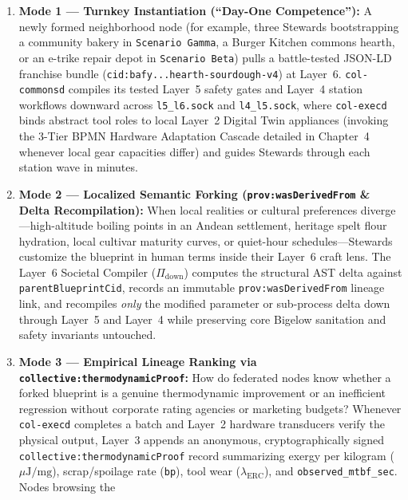 \begin{enumerate}
\item \textbf{Mode 1 --- Turnkey Instantiation (``Day-One Competence''):} A newly formed
        neighborhood node (for example, three Stewards bootstrapping a community bakery in
        \texttt{Scenario Gamma}, a Burger Kitchen commons hearth, or an e-trike repair depot
        in \texttt{Scenario Beta}) pulls a battle-tested JSON-LD franchise bundle
        (\texttt{cid:bafy...hearth-sourdough-v4}) at Layer~6. \texttt{col-commonsd} compiles
        its tested Layer~5 safety gates and Layer~4 station workflows downward across
        \texttt{l5\_l6.sock} and \texttt{l4\_l5.sock}, where \texttt{col-execd} binds
        abstract tool roles to local Layer~2 Digital Twin appliances (invoking the 3-Tier
        BPMN Hardware Adaptation Cascade detailed in Chapter~4 whenever local gear capacities
        differ) and guides Stewards through each station wave in minutes.
\item \textbf{Mode 2 --- Localized Semantic Forking (\texttt{prov:wasDerivedFrom} \& Delta Recompilation):}
        When local realities or cultural preferences diverge---high-altitude boiling points
        in an Andean settlement, heritage spelt flour hydration, local cultivar maturity curves,
        or quiet-hour schedules---Stewards customize the blueprint in human terms inside their
        Layer~6 craft lens. The Layer~6 Societal Compiler ($\Pi_{\mathrm{down}}$) computes the
        structural AST delta against \texttt{parentBlueprintCid}, records an immutable
        \texttt{prov:wasDerivedFrom} lineage link, and recompiles \textit{only} the modified
        parameter or sub-process delta down through Layer~5 and Layer~4 while preserving core
        Bigelow sanitation and safety invariants untouched.
\item \textbf{Mode 3 --- Empirical Lineage Ranking via \texttt{collective:thermodynamicProof}:}
        How do federated nodes know whether a forked blueprint is a genuine thermodynamic
        improvement or an inefficient regression without corporate rating agencies or
        marketing budgets? Whenever \texttt{col-execd} completes a batch and Layer~2 hardware
        transducers verify the physical output, Layer~3 appends an anonymous, cryptographically
        signed \texttt{collective:thermodynamicProof} record summarizing exergy per kilogram
        ($\mu\mathrm{J}/\mathrm{mg}$), scrap/spoilage rate (\texttt{bp}), tool wear
        ($\lambda_{\mathrm{ERC}}$), and \texttt{observed\_mtbf\_sec}. Nodes browsing the

\end{enumerate}

